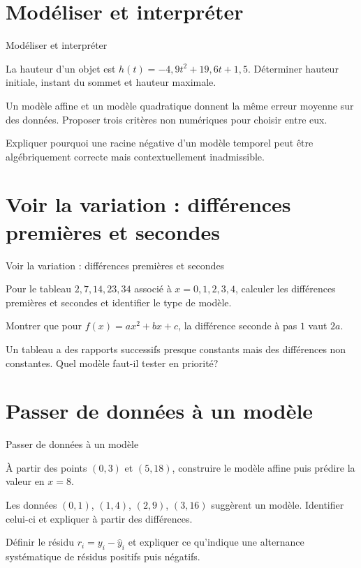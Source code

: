 \section{Modéliser et interpréter}
\label{workbook:section:04.04}
\begin{exerciseblock}{Modéliser et interpréter}
\item La hauteur d'un objet est $h(t)=-4{,}9t^2+19{,}6t+1{,}5$. Déterminer hauteur initiale, instant du sommet et hauteur maximale.
\item Un modèle affine et un modèle quadratique donnent la même erreur moyenne sur des données. Proposer trois critères non numériques pour choisir entre eux.
\item Expliquer pourquoi une racine négative d'un modèle temporel peut être algébriquement correcte mais contextuellement inadmissible.
\end{exerciseblock}
\section{Voir la variation : différences premières et secondes}
\label{workbook:section:04.05}
\begin{exerciseblock}{Voir la variation : différences premières et secondes}
\item Pour le tableau $2,7,14,23,34$ associé à $x=0,1,2,3,4$, calculer les différences premières et secondes et identifier le type de modèle.
\item Montrer que pour $f(x)=ax^2+bx+c$, la différence seconde à pas $1$ vaut $2a$.
\item Un tableau a des rapports successifs presque constants mais des différences non constantes. Quel modèle faut-il tester en priorité?
\end{exerciseblock}
\section{Passer de données à un modèle}
\label{workbook:section:04.06}
\begin{exerciseblock}{Passer de données à un modèle}
\item À partir des points $(0,3)$ et $(5,18)$, construire le modèle affine puis prédire la valeur en $x=8$.
\item Les données $(0,1)$, $(1,4)$, $(2,9)$, $(3,16)$ suggèrent un modèle. Identifier celui-ci et expliquer à partir des différences.
\item Définir le résidu $r_i=y_i-\widehat y_i$ et expliquer ce qu'indique une alternance systématique de résidus positifs puis négatifs.
\end{exerciseblock}
